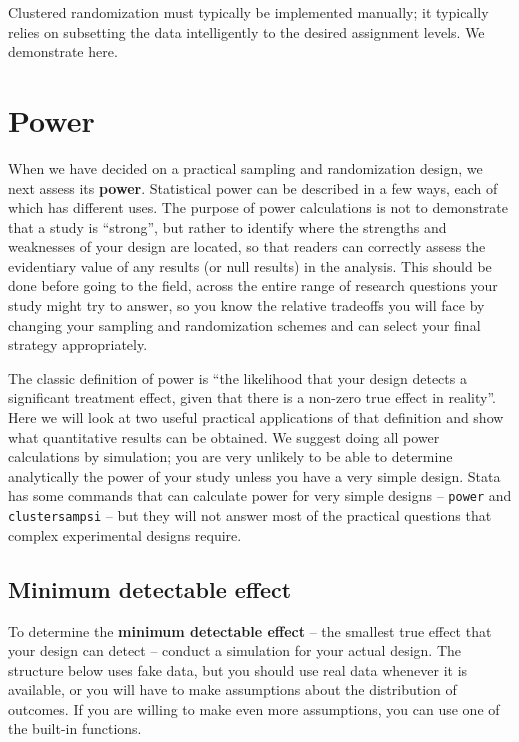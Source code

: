 Clustered randomization must typically be implemented manually;
it typically relies on subsetting the data intelligently
to the desired assignment levels.
We demonstrate here.

{
}


\section{Power}

When we have decided on a practical sampling and randomization design,
we next assess its \textbf{power}.
Statistical power can be described in a few ways,
each of which has different uses.
The purpose of power calculations is not to
demonstrate that a study is ``strong'',
but rather to identify where the strengths and weaknesses
of your design are located, so that readers
can correctly assess the evidentiary value of
any results (or null results) in the analysis.
This should be done before going to the field,
across the entire range of research questions
your study might try to answer,
so you know the relative tradeoffs you will face
by changing your sampling and randomization schemes
and can select your final strategy appropriately.

The classic definition of power is
``the likelihood that your design detects a significant treatment effect,
given that there is a non-zero true effect in reality''.
Here we will look at two useful practical applications
of that definition and show what quantitative results can be obtained.
We suggest doing all power calculations by simulation;
you are very unlikely to be able to determine analytically
the power of your study unless you have a very simple design.
Stata has some commands that can calculate power for
very simple designs -- \texttt{power} and \texttt{clustersampsi} --
but they will not answer most of the practical questions
that complex experimental designs require.

\subsection{Minimum detectable effect}

To determine the \textbf{minimum detectable effect}
-- the smallest true effect that your design can detect --
conduct a simulation for your actual design.
The structure below uses fake data,
but you should use real data whenever it is available,
or you will have to make assumptions about the distribution of outcomes.
If you are willing to make even more assumptions,
you can use one of the built-in functions.

